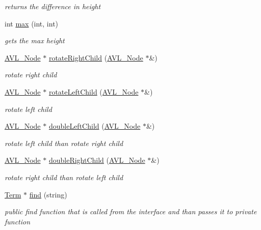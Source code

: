 \begin{DoxyCompactItemize}
\begin{DoxyCompactList}\small\item\em returns the difference in height \end{DoxyCompactList}\item 
int \hyperlink{class_a_v_l_tree_index_a66e4cf16a8a6a4d7a2d8f833eaf05ec4}{max} (int, int)
\begin{DoxyCompactList}\small\item\em gets the max height \end{DoxyCompactList}\item 
\hyperlink{struct_a_v_l___node}{A\+V\+L\+\_\+\+Node} $\ast$ \hyperlink{class_a_v_l_tree_index_a9eb44deb708707f01e819bb7d43ef9e8}{rotate\+Right\+Child} (\hyperlink{struct_a_v_l___node}{A\+V\+L\+\_\+\+Node} $\ast$\&)
\begin{DoxyCompactList}\small\item\em rotate right child \end{DoxyCompactList}\item 
\hyperlink{struct_a_v_l___node}{A\+V\+L\+\_\+\+Node} $\ast$ \hyperlink{class_a_v_l_tree_index_ad57215a76dda89d84d5aa1ad0025fdcb}{rotate\+Left\+Child} (\hyperlink{struct_a_v_l___node}{A\+V\+L\+\_\+\+Node} $\ast$\&)
\begin{DoxyCompactList}\small\item\em rotate left child \end{DoxyCompactList}\item 
\hyperlink{struct_a_v_l___node}{A\+V\+L\+\_\+\+Node} $\ast$ \hyperlink{class_a_v_l_tree_index_a353c476f4b6a48af1ec014e15dd321b5}{double\+Left\+Child} (\hyperlink{struct_a_v_l___node}{A\+V\+L\+\_\+\+Node} $\ast$\&)
\begin{DoxyCompactList}\small\item\em rotate left child than rotate right child \end{DoxyCompactList}\item 
\hyperlink{struct_a_v_l___node}{A\+V\+L\+\_\+\+Node} $\ast$ \hyperlink{class_a_v_l_tree_index_aaeb1558d866649c461b3d3719d1a5fea}{double\+Right\+Child} (\hyperlink{struct_a_v_l___node}{A\+V\+L\+\_\+\+Node} $\ast$\&)
\begin{DoxyCompactList}\small\item\em rotate right child than rotate left child \end{DoxyCompactList}\item 
\hyperlink{class_term}{Term} $\ast$ \hyperlink{class_a_v_l_tree_index_abd40888cc3d9b4f6b7cacca9b4d7f327}{find} (string)
\begin{DoxyCompactList}\small\item\em public find function that is called from the interface and than passes it to private function \end{DoxyCompactList}\item 

\end{DoxyCompactItemize}
